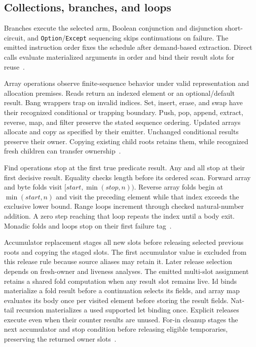 \documentclass[11pt]{article}
\newcommand{\code}[1]{\texttt{#1}}
\begin{document}
\subsection{Collections, branches, and loops}

Branches execute the selected arm, Boolean conjunction and disjunction short-circuit, and \code{Option}/\code{Except} sequencing skips continuations on failure.  The emitted instruction order fixes the schedule after demand-based extraction.  Direct calls evaluate materialized arguments in order and bind their result slots for reuse~\cite{extract,binary}.

Array operations observe finite-sequence behavior under valid representation and allocation premises.  Reads return an indexed element or an optional/default result.  Bang wrappers trap on invalid indices.  Set, insert, erase, and swap have their recognized conditional or trapping boundary.  Push, pop, append, extract, reverse, map, and filter preserve the stated sequence ordering.  Updated arrays allocate and copy as specified by their emitter.  Unchanged conditional results preserve their owner.  Copying existing child roots retains them, while recognized fresh children can transfer ownership~\cite{values,binary}.

Find operations stop at the first true predicate result.  Any and all stop at their first decisive result.  Equality checks length before its ordered scan.  Forward array and byte folds visit $[\mathit{start},\min(\mathit{stop},n))$.  Reverse array folds begin at $\min(\mathit{start},n)$ and visit the preceding element while that index exceeds the exclusive lower bound.  Range loops increment through checked natural-number addition.  A zero step reaching that loop repeats the index until a body exit.  Monadic folds and loops stop on their first failure tag~\cite{binary}.

Accumulator replacement stages all new slots before releasing selected previous roots and copying the staged slots.  The first accumulator value is excluded from this release rule because source aliases may retain it.  Later release selection depends on fresh-owner and liveness analyses.  The emitted multi-slot assignment retains a shared fold computation when any result slot remains live.  Id binds materialize a fold result before a continuation selects its fields, and array map evaluates its body once per visited element before storing the result fields.  Nat-tail recursion materializes a used supported let binding once.  Explicit releases execute even when their counter results are unused.  For-in cleanup stages the next accumulator and stop condition before releasing eligible temporaries, preserving the returned owner slots~\cite{extract,storage,values,binary}.
\end{document}
